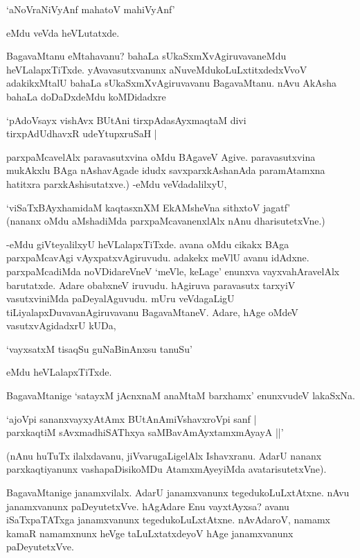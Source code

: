\begin{shloka}
`aNoVraNiVyAnf mahatoV mahiVyAnf'
\end{shloka}

eMdu veVda heVLutatxde.

BagavaMtanu eMtahavanu? bahaLa sUkaSxmXvAgiruvavaneMdu heVLalapxTiTxde. yAvavasutxvanunx aNuveMdukoLuLxtitxdedxVvoV adakikxMtalU bahaLa sUkaSxmXvAgiruvavanu BagavaMtanu. nAvu AkAsha bahaLa doDaDxdeMdu koMDidadxre 

\begin{shloka}
`pAdoV\s sayx vishAvx BUtAni tirxpAdasAyxmaqtaM divi\\
tirxpAdUdhavxR udeYtupxruSaH |
\end{shloka}

parxpaMcavelAlx paravasutxvina oMdu BAgaveV Agive. paravasutxvina mukAkxlu BAga nAshavAgade idudx savxparxkAshanAda paramAtamxna hatitxra parxkAshisutatxve.) -eMdu veVdadalilxyU,

\begin{shloka}
`viSaTxBAyxhamidaM kaqtasxnXM EkAMsheVna sithxtoV jagatf'\\
(nananx oMdu aMshadiMda parxpaMcavanenxlAlx nAnu dharisutetxVne.)
\end{shloka}

-eMdu giVteyalilxyU heVLalapxTiTxde. avana oMdu cikakx BAga parxpaMcavAgi vAyxpatxvAgiruvudu. adakekx meVlU avanu idAdxne. parxpaMcadiMda noVDidareVneV `meVle, keLage' enunxva vayxvahAravelAlx barutatxde. Adare obabxneV iruvudu. hAgiruva paravasutx tarxyiV vasutxviniMda paDeyalAguvudu. mUru veVdagaLigU tiLiyalapxDuvavanAgiruvavanu BagavaMtaneV. Adare, hAge oMdeV vasutxvAgidadxrU kUDa,

\begin{shloka}
`vayxsatxM tisaqSu guNaBinAnxsu tanuSu'
\end{shloka}

eMdu heVLalapxTiTxde.

BagavaMtanige `satayxM jAcnxnaM anaMtaM barxhamx' enunxvudeV lakaSxNa.

\begin{shloka}
`ajoV\s pi sananxvayxyAtAmx BUtAnAmiVshavxroV\s pi sanf |\\
parxkaqtiM sAvxmadhiSAThxya saMBavAmAyxtamxmAyayA ||'
\end{shloka}

(nAnu huTuTx ilalxdavanu, jiVvarugaLigelAlx Ishavxranu. AdarU nananx parxkaqtiyanunx vashapaDisikoMDu AtamxmAyeyiMda avatarisutetxVne).


BagavaMtanige janamxvilalx. AdarU janamxvanunx tegedukoLuLxtAtxne. nAvu janamxvanunx paDeyutetxVve. hAgAdare Enu vayxtAyxsa? avanu iSaTxpaTATxga janamxvanunx tegedukoLuLxtAtxne. nAvAdaroV, namamx kamaR namamxnunx heVge taLuLxtatxdeyoV hAge janamxvanunx paDeyutetxVve.

